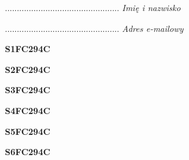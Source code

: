 \begin{turn}{90}\begin{minipage}{\linewidth} \vspace{20mm} ................................................  \textit{Imię i nazwisko}\end{minipage}\end{turn}

\begin{turn}{90}\begin{minipage}{\linewidth} \vspace{20mm} ................................................  \textit{Adres e-mailowy}\end{minipage}\end{turn}

\begin{turn}{90}\huge \begin{minipage}{\linewidth} \vspace{10mm}\textbf{S1FC294C}\end{minipage}\end{turn}

\begin{turn}{90}\huge \begin{minipage}{\linewidth} \vspace{10mm}\textbf{S2FC294C}\end{minipage}\end{turn}

\begin{turn}{90}\huge \begin{minipage}{\linewidth} \vspace{10mm}\textbf{S3FC294C}\end{minipage}\end{turn}

\begin{turn}{90}\huge \begin{minipage}{\linewidth} \vspace{10mm}\textbf{S4FC294C}\end{minipage}\end{turn}

\begin{turn}{90}\huge \begin{minipage}{\linewidth} \vspace{10mm}\textbf{S5FC294C}\end{minipage}\end{turn}

\begin{turn}{90}\huge \begin{minipage}{\linewidth} \vspace{10mm}\textbf{S6FC294C}\end{minipage}\end{turn}

